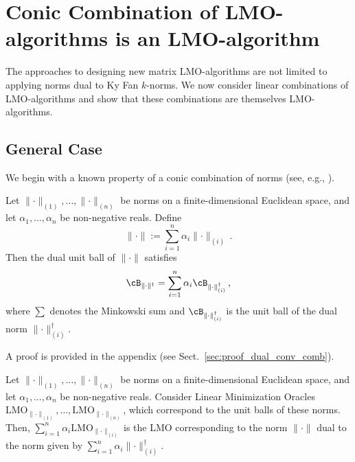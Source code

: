 \documentclass[smallextended,referee,envcountsect]{svjour3}
\newcommand{\norm}[1]{\lVert #1\rVert}
\newcommand{\sectionref}[1]{Sect.~\ref{#1}}
\begin{document}
 \section{Conic Combination of LMO-algorithms is an LMO-algorithm}
 \label{sec:conic_combo}
 
 The approaches to designing new matrix LMO-algorithms are not limited to applying norms dual to Ky Fan $k$-norms. We now consider linear combinations of LMO-algorithms and show that these combinations are themselves LMO-algorithms.
 
 \subsection{General Case}
 We begin with a known property of a conic combination of norms (see, e.g., \citep[Table 1]{yu2012arithmetic}).
 
 \begin{lemma}\label{lemma:dual_to_conv_comb}
   Let $\norm{\cdot}_{(1)},\dots,\norm{\cdot}_{(n)}$ be norms on a finite-dimensional Euclidean space, and let $\alpha_1,\dots,\alpha_n$ be non-negative reals. Define
   \[
     \norm{\cdot} := \sum_{i = 1}^n \alpha_i \norm{\cdot}_{(i)}\,.
   \]
   Then the dual unit ball of $\norm{\cdot}$ satisfies
   \[
     \cB_{\norm{\cdot}^\dagger}
     = \sum_{i = 1}^n \alpha_i \cB_{\norm{\cdot}_{(i)}^\dagger}\,,
   \]
   where $\sum$ denotes the Minkowski sum and $\cB_{\norm{\cdot}_{(i)}^\dagger}$ is the unit ball of the dual norm $\norm{\cdot}_{(i)}^\dagger$.
 \end{lemma}
 
 A proof is provided in the appendix (see \sectionref{sec:proof_dual_conv_comb}).
 
 \begin{lemma}\label{lemma:lin_comb_lmo}
  Let $\norm{\cdot}_{(1)}, \dots, \norm{\cdot}_{(n)}$ be norms on a finite-dimensional Euclidean space, and let $\alpha_1, \dots, \alpha_n$ be non-negative reals. Consider Linear Minimization Oracles $\mathrm{LMO}_{\norm{\cdot}_{(1)}}, \dots, \mathrm{LMO}_{\norm{\cdot}_{(n)}}$, which correspond to the unit balls of these norms. Then, $\sum_{i = 1}^n \alpha_i \mathrm{LMO}_{\norm{\cdot}_{(i)}}$ is the LMO corresponding to the norm $\norm{\cdot}$ dual to the norm given by $\sum_{i = 1}^n \alpha_i \norm{\cdot}_{(i)}^\dagger$.
\end{lemma}
\end{document}
